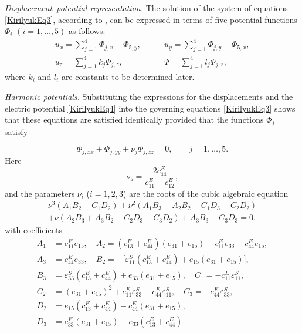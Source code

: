 \medskip
\emph{Displacement–potential representation.} The solution of the system of equations \eqref{KirilyukEq3}, according to \cite{Kirilyuk13}, can be expressed in terms of five potential functions $\Phi_i$ $(i=1,\dots,5)$ as follows:
\begin{equation}
	\begin{aligned}
		u_x = \sum_{j=1}^{4} \Phi_{j,x} + \Phi_{5,y},
		\qquad &
		u_y = \sum_{j=1}^{4} \Phi_{j,y} - \Phi_{5,x},
		\\
		u_z = \sum_{j=1}^{4} k_j \Phi_{j,z},
		\qquad &
		\Psi = \sum_{j=1}^{4} l_j \Phi_{j,z},
	\end{aligned}
	\label{KirilyukEq4}
\end{equation}
where $k_i$ and $l_i$ are constants to be determined later.

\medskip
\emph{Harmonic potentials.} Substituting the expressions for the displacements and the electric potential \eqref{KirilyukEq4} into the governing equations \eqref{KirilyukEq3} shows that these equations are satisfied identically provided that the functions $\Phi_j$ satisfy

\begin{equation}
	\Phi_{j,xx} + \Phi_{j,yy} + \nu_j \Phi_{j,zz} = 0,
	\qquad j=1,\dots,5 .
	\label{KirilyukEq5}
\end{equation}
%
Here
\[
\nu_{5} = \frac{2c_{44}^{E}}{c_{11}^{E}-c_{12}^{E}},
\]
and the parameters $\nu_i$ ($i=1,2,3$) are the roots of the cubic algebraic equation
\begin{multline*}
	\nu^{3}(A_{1}B_{2}-C_{1}D_{2})
	+\nu^{2}(A_{1}B_{3}+A_{2}B_{2}-C_{1}D_{3}-C_{2}D_{2})
	\\
	+\nu(A_{2}B_{3}+A_{3}B_{2}-C_{2}D_{3}-C_{3}D_{2})
	+ A_{3}B_{3}-C_{3}D_{3} = 0 .
\end{multline*}
%
with coefficients
\begin{equation}
	\begin{aligned}
		A_{1} &= c_{11}^{E} e_{15},\quad
		A_{2} = (c_{13}^{E}+c_{44}^{E})(e_{31}+e_{15})
		- c_{11}^{E} e_{33}
		- c_{44}^{E} e_{15}, \\
		A_{3} &= c_{44}^{E} e_{33}, \quad
		B_{2} = -\bigl[\varepsilon_{11}^{S}(c_{13}^{E}+c_{44}^{E})
		+ e_{15}(e_{31}+e_{15})\bigr], \\
		B_{3} &= \varepsilon_{33}^{S}(c_{13}^{E}+c_{44}^{E})
		+ e_{33}(e_{31}+e_{15}), \quad
		C_{1} = -c_{11}^{E}\varepsilon_{11}^{S}, \\
		C_{2} &= (e_{31}+e_{15})^{2}
		+ c_{11}^{E}\varepsilon_{33}^{S}
		+ c_{44}^{E}\varepsilon_{11}^{S}, \quad
		C_{3} = -c_{44}^{E}\varepsilon_{33}^{S}, \\
		D_{2} &= e_{15}(c_{13}^{E}+c_{44}^{E})
		- c_{44}^{E}(e_{31}+e_{15}), 
		\\
		D_{3} &= c_{33}^{E}(e_{31}+e_{15})
		- e_{33}(c_{13}^{E}+c_{44}^{E}).
	\end{aligned}
	\label{KirilyukEq6}
\end{equation}

